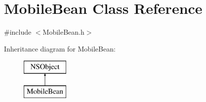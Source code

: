 \hypertarget{interface_mobile_bean}{
\section{\-Mobile\-Bean \-Class \-Reference}
\label{interface_mobile_bean}
}


{\ttfamily \#include $<$\-Mobile\-Bean.\-h$>$}

\-Inheritance diagram for \-Mobile\-Bean\-:\begin{figure}[H]
\begin{center}
\leavevmode
\includegraphics[height=2.000000cm]{interface_mobile_bean}
\end{center}
\end{figure}
